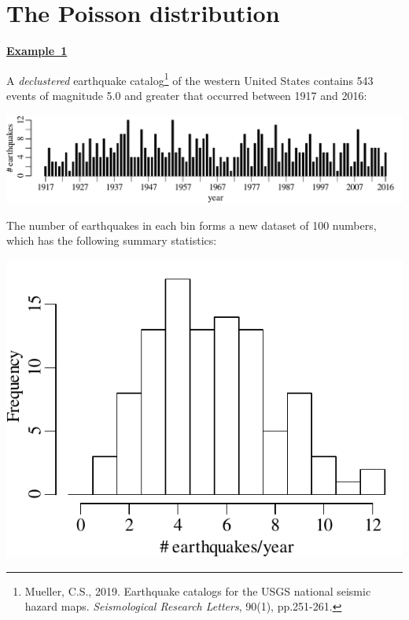 \chapter{The Poisson distribution}
\label{ch:poisson}

\textbf{\underline{Example~1}}\medskip

A \emph{declustered} earthquake catalog\footnote{Mueller, C.S.,
  2019. Earthquake catalogs for the USGS national seismic hazard
  maps. \textit{Seismological Research Letters}, 90(1), pp.251-261.}
of the western United States contains 543 events of magnitude 5.0 and
greater that occurred between 1917 and 2016:\medskip

\noindent\includegraphics[width=\textwidth]{../figures/declusteredquakes.pdf}
\begingroup {}
\label{fig:declusteredquakes}
\endgroup

The number of earthquakes in each bin forms a new dataset of 100
numbers, which has the following summary statistics:

\noindent\begin{minipage}[t][][b]{.4\textwidth}
\includegraphics[width=\textwidth]{../figures/declusteredquakesperyear.pdf}
\medskip
\end{minipage}
\begin{minipage}[t][][t]{.6\textwidth}
  \label{fig:declusteredquakesperyear}
\end{minipage}

